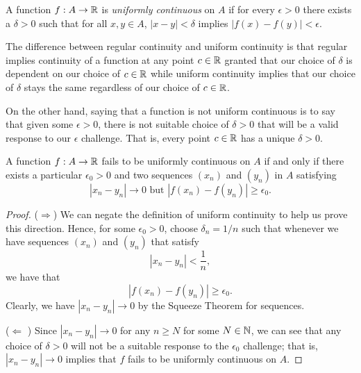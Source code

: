 \begin{definition}
A function \( f: A \to \mathbb{R}  \) is \textit{uniformly continuous} on \( A  \) if for every \( \epsilon > 0  \) there exists a \( \delta > 0  \) such that for all \( x,y \in A  \), \( | x - y  | < \delta  \) implies \( | f(x) - f(y) | < \epsilon. \)
\end{definition}

The difference between regular continuity and uniform continuity is that regular implies continuity of a function at any point \( c \in \mathbb{R}  \) granted that our choice of \( \delta  \) is dependent on our choice of \( c \in \mathbb{R}  \) while uniform continuity implies that our choice of \( \delta  \) stays the same regardless of our choice of \( c \in \mathbb{R}  \).

On the other hand, saying that a function is not uniform continuous is to say that given some \( \epsilon > 0  \), there is not suitable choice of \( \delta > 0  \) that will be a valid response to our \( \epsilon  \) challenge. That is, every point \( c \in \mathbb{R}  \) has a unique \( \delta > 0   \).   

\begin{theorem}
    A function \( f: A \to \mathbb{R}  \) fails to be uniformly continuous on \( A  \) if and only if there exists a particular \( \epsilon_0 > 0  \) and two sequences \( (x_n) \) and \( (y_n) \) in \( A  \) satisfying 
    \[ | x_n - y_n  | \to 0 \text{~but~} | f(x_n) - f(y_n) | \geq \epsilon_0. \]
    \end{theorem}

\begin{proof}
    (\( \Rightarrow \)) We can negate the definition of uniform continuity to help us prove this direction. Hence, for some \( \epsilon_0 > 0  \), choose \( \delta_n = 1/n  \) such that whenever we have  sequences \( (x_n) \) and \( (y_n) \) that satisfy
    \[ | x_n - y_n  | < \frac{ 1 }{ n }, \]
we have that 
\[ | f(x_n) - f(y_n) | \geq \epsilon_0. \]
Clearly, we have \( | x_n - y_n | \to 0  \) by the Squeeze Theorem for sequences.

(\( \Leftarrow \) ) Since \( | x_n - y_n | \to 0  \) for any \( n \geq N   \) for some \( N \in \mathbb{N}  \), we can see that any choice of \( \delta > 0  \) will not be a suitable response to the \( \epsilon_0  \) challenge; that is, \( | x_n - y_n | \to 0  \) implies that \( f  \) fails to be uniformly continuous on \( A  \). 
\end{proof}


